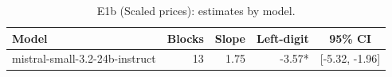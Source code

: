 \begin{table}[t]
\centering
\caption{E1b (Scaled prices): estimates by model.}
\label{tab:e1bmodel}
\small
\begin{tabular}{lrrrc}
\toprule
Model & Blocks & Slope & Left-digit & 95\% CI \\
\midrule
mistral-small-3.2-24b-instruct & 13 & 1.75 & -3.57* & [-5.32, -1.96] \\
\bottomrule
\end{tabular}
\end{table}
